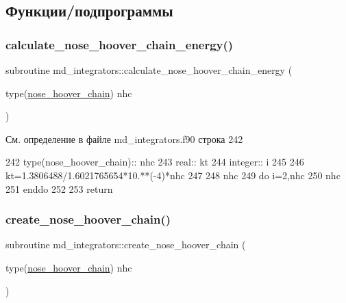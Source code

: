 \subsection{Функции/подпрограммы}
\mbox{\label{namespacemd__integrators_a67084641a81f648ac71c15c20428c015}} 
\subsubsection{\texorpdfstring{calculate\+\_\+nose\+\_\+hoover\+\_\+chain\+\_\+energy()}{calculate\_nose\_hoover\_chain\_energy()}}
{\footnotesize\ttfamily subroutine md\+\_\+integrators\+::calculate\+\_\+nose\+\_\+hoover\+\_\+chain\+\_\+energy (\begin{DoxyParamCaption}\item[{type(\mbox{\hyperlink{structmd__general_1_1nose__hoover__chain}{nose\+\_\+hoover\+\_\+chain}})}]{nhc }\end{DoxyParamCaption})}



См. определение в файле md\+\_\+integrators.\+f90 строка 242


\begin{DoxyCode}
242     \textcolor{keywordtype}{type}(nose\_hoover\_chain):: nhc
243     \textcolor{keywordtype}{real}:: kt
244     \textcolor{keywordtype}{integer}::       i
245 
246     kt=1.3806488/1.6021765654*10.**(-4)*nhc%
247 
248     nhc%
249     \textcolor{keywordflow}{do} i=2,nhc%
250         nhc%
251 \textcolor{keywordflow}{    enddo}
252 
253     \textcolor{keywordflow}{return}
\end{DoxyCode}
\mbox{\label{namespacemd__integrators_aa74788b2d003c16024b8eb999ea01c3c}} 
\subsubsection{\texorpdfstring{create\+\_\+nose\+\_\+hoover\+\_\+chain()}{create\_nose\_hoover\_chain()}}
{\footnotesize\ttfamily subroutine md\+\_\+integrators\+::create\+\_\+nose\+\_\+hoover\+\_\+chain (\begin{DoxyParamCaption}\item[{type(\mbox{\hyperlink{structmd__general_1_1nose__hoover__chain}{nose\+\_\+hoover\+\_\+chain}})}]{nhc }\end{DoxyParamCaption})}



